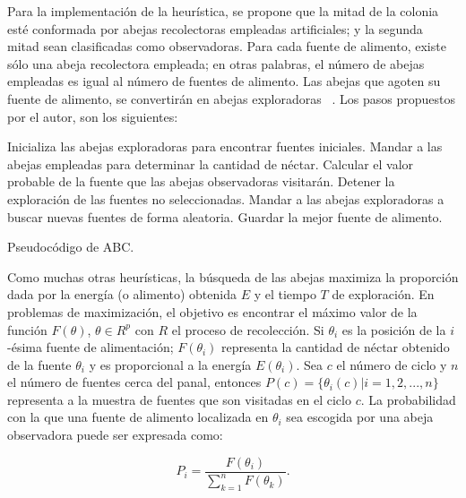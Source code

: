 Para la implementación de la heurística, se propone que la mitad de la colonia
esté conformada por abejas recolectoras empleadas artificiales; y la segunda
mitad sean clasificadas como observadoras. Para cada fuente de alimento, existe
sólo una abeja recolectora empleada; en otras palabras, el número de abejas
empleadas es igual al número de fuentes de alimento. Las abejas que agoten su
fuente de alimento, se convertirán en abejas exploradoras
~\cite{karaboga2005idea}. Los pasos propuestos por el autor, son los siguientes:

\begin{algorithm}
  \begin{algorithmic}[1]
      \Repeat
        \State Inicializa las abejas exploradoras para encontrar fuentes
        iniciales.
        \State Mandar a las abejas empleadas para determinar la cantidad de
        néctar.
        \State Calcular el valor probable de la fuente que las abejas
        observadoras visitarán.
        \State Detener la exploración de las fuentes no seleccionadas.
        \State Mandar a las abejas exploradoras a buscar nuevas fuentes de forma
        aleatoria.
        \State Guardar la mejor fuente de alimento.
    \EndProcedure
  \end{algorithmic}
  \caption{Pseudocódigo de ABC.}
  \label{code:bee-steps}
\end{algorithm}

Como muchas otras heurísticas, la búsqueda de las abejas maximiza la proporción
dada por la energía (o alimento) obtenida $E$ y el tiempo $T$ de exploración.
En problemas de maximización, el objetivo es encontrar el máximo valor de la
función $F(\theta)$, $\theta \in R^{p}$ con $R$ el proceso de
recolección. Si $\theta_{i}$ es la posición de la $i$-ésima fuente de
alimentación; $F(\theta_{i})$ representa la cantidad de néctar obtenido de la
fuente $\theta_{i}$ y es proporcional a la energía $E(\theta_{i})$. Sea $c$ el
número de ciclo y $n$ el número de fuentes cerca del panal, entonces
$P(c) = \{\theta_{i}(c) | i = 1,2,...,n\}$ representa a la muestra de fuentes
que son visitadas en el ciclo $c$. La probabilidad con la que una fuente de
alimento localizada en $\theta_{i}$ sea escogida por una abeja observadora puede ser
expresada como:

\begin{displaymath}
  P_{i} = \frac{F(\theta_{i})}{\sum_{k=1}^{n} F(\theta_{k})}.
\end{displaymath}

